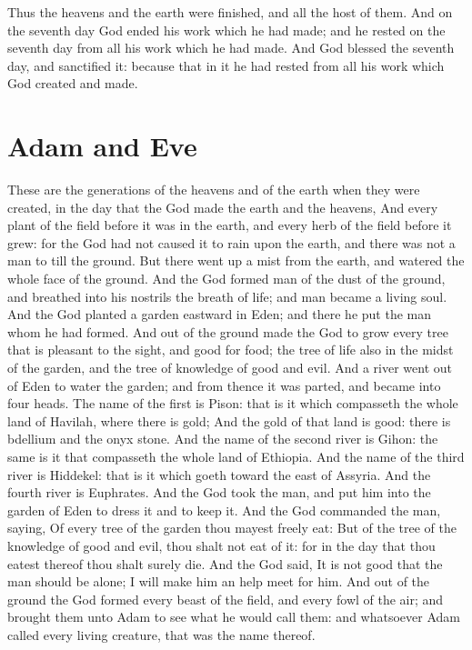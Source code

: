\begin{biblechapter} %
\verse Thus the heavens and the earth were finished, and all the host of them.
\verse And on the seventh day God ended his work which he had made; and he rested on the seventh day from all his work which he had made.
\verse And God blessed the seventh day, and sanctified it: because that in it he had rested from all his work which God created and made.
\section*{Adam and Eve}
\verse These are the generations of the heavens and of the earth when they were created, in the day that the \LORD God made the earth and the heavens,
\verse And every plant of the field before it was in the earth, and every herb of the field before it grew: for the \LORD God had not caused it to rain upon the earth, and there was not a man to till the ground.
\verse But there went up a mist from the earth, and watered the whole face of the ground.
\verse And the \LORD God formed man of the dust of the ground, and breathed into his nostrils the breath of life; and man became a living soul.
\verse And the \LORD God planted a garden eastward in Eden; and there he put the man whom he had formed.
\verse And out of the ground made the \LORD God to grow every tree that is pleasant to the sight, and good for food; the tree of life also in the midst of the garden, and the tree of knowledge of good and evil.
\verse And a river went out of Eden to water the garden; and from thence it was parted, and became into four heads.
\verse The name of the first is Pison: that is it which compasseth the whole land of Havilah, where there is gold;
\verse And the gold of that land is good: there is bdellium and the onyx stone.
\verse And the name of the second river is Gihon: the same is it that compasseth the whole land of Ethiopia.
\verse And the name of the third river is Hiddekel: that is it which goeth toward the east of Assyria. And the fourth river is Euphrates.
\verse And the \LORD God took the man, and put him into the garden of Eden to dress it and to keep it.
\verse And the \LORD God commanded the man, saying, Of every tree of the garden thou mayest freely eat:
\verse But of the tree of the knowledge of good and evil, thou shalt not eat of it: for in the day that thou eatest thereof thou shalt surely die.
\verse And the \LORD God said, It is not good that the man should be alone; I will make him an help meet for him.
\verse And out of the ground the \LORD God formed every beast of the field, and every fowl of the air; and brought them unto Adam to see what he would call them: and whatsoever Adam called every living creature, that was the name thereof.

\end{biblechapter}
